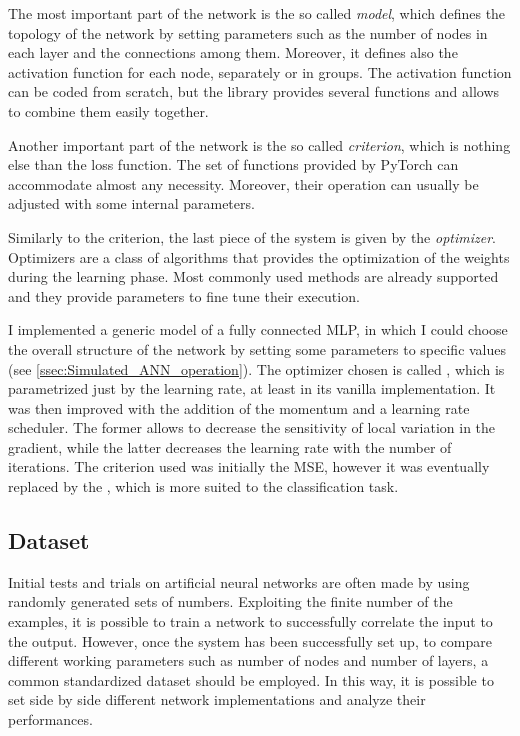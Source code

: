 The most important part of the network is the so called \textit{model}, which defines the topology of the network by setting parameters such as the number of nodes in each layer and the connections among them.
Moreover, it defines also the activation function for each node, separately or in groups.
The activation function can be coded from scratch, but the library provides several functions and allows to combine them easily together.

Another important part of the network is the so called \textit{criterion}, which is nothing else than the loss function.
The set of functions provided by PyTorch can accommodate almost any necessity.
Moreover, their operation can usually be adjusted with some internal parameters.

Similarly to the criterion, the last piece of the system is given by the \textit{optimizer}.
Optimizers are a class of algorithms that provides the optimization of the weights during the learning phase.
Most commonly used methods are already supported and they provide parameters to fine tune their execution.

I implemented a generic model of a fully connected \acf{MLP}, in which I could choose the overall structure of the network by setting some parameters to specific values (see \autoref{ssec:Simulated_ANN_operation}).
The optimizer chosen is called , which is parametrized just by the learning rate, at least in its vanilla implementation.
It was then improved with the addition of the momentum and a learning rate scheduler.
The former allows to decrease the sensitivity of local variation in the gradient, while the latter decreases the learning rate with the number of iterations.
The criterion used was initially the \acs{MSE}, however it was eventually replaced by the , which is more suited to the classification task.
 

\subsection{Dataset}
\label{ssec:PyDataset}
Initial tests and trials on artificial neural networks are often made by using randomly generated sets of numbers.
Exploiting the finite number of the examples, it is possible to train a network to successfully correlate the input to the output.
However, once the system has been successfully set up, to compare different working parameters such as number of nodes and number of layers, a common standardized dataset should be employed.
In this way, it is possible to set side by side different network implementations and analyze their performances.

